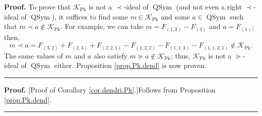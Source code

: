 \documentclass[numbers=enddot,12pt,final,onecolumn,notitlepage]{scrartcl}%
\theoremstyle{definition}
\newenvironment{proof}[1][Proof]{\noindent\textbf{#1.} }{\ \rule{0.5em}{0.5em}}
\newenvironment{verlong}{}{}
\begin{document}
\begin{verlong}
\begin{proof}
To prove that $\mathcal{K}_{\operatorname*{Pk}}$ is not a $\left.
\prec\right.  $-ideal of $\operatorname*{QSym}$ (and not even a right $\left.
\prec\right.  $-ideal of $\operatorname*{QSym}$), it suffices to find some
$m\in\mathcal{K}_{\operatorname*{Pk}}$ and some $a\in\operatorname*{QSym}$
such that $m\left.  \prec\right.  a\notin\mathcal{K}_{\operatorname*{Pk}}$.
For example, we can take $m=F_{\left(  1,2\right)  }-F_{\left(  3\right)  }$
and $a=F_{\left(  1\right)  }$; then,
\[
m\left.  \prec\right.  a=F_{\left(  3,2\right)  }+F_{\left(  2,3\right)
}+F_{\left(  2,2,1\right)  }-F_{\left(  1,2,2\right)  }-F_{\left(
1,1,3\right)  }-F_{\left(  1,1,2,1\right)  }\notin\mathcal{K}%
_{\operatorname*{Pk}}.
\]
The same values of $m$ and $a$ also satisfy $m\left.  \succeq\right.
a\notin\mathcal{K}_{\operatorname*{Pk}}$; thus, $\mathcal{K}%
_{\operatorname*{Pk}}$ is not a $\left.  \succeq\right.  $-ideal of
$\operatorname*{QSym}$ either. Proposition \ref{prop.Pk.dend} is now proven.
\end{proof}

\begin{proof}
[Proof of Corollary \ref{cor.dendri.Pk}.]Follows from Proposition
\ref{prop.Pk.dend}.
\end{proof}
\end{verlong}
\end{document}
